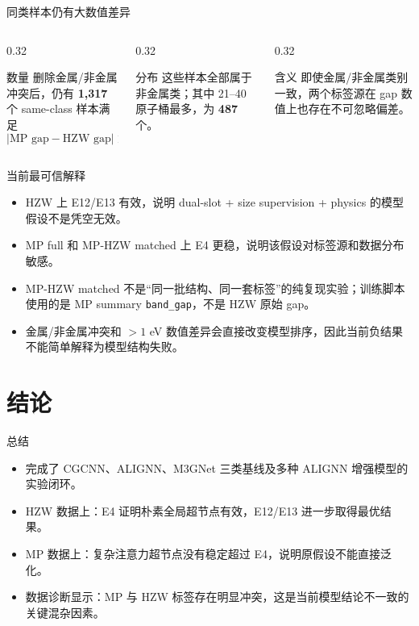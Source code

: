 \documentclass[aspectratio=169]{beamer}
\begin{document}
\begin{frame}{同类样本仍有大数值差异}
\small
\begin{columns}[T,onlytextwidth]
\begin{column}{0.32\textwidth}
\begin{block}{数量}
删除金属/非金属冲突后，仍有 \textbf{1,317} 个 same-class 样本满足
\[
|\text{MP gap} - \text{HZW gap}| > 1\ \text{eV}.
\]
\end{block}
\end{column}
\begin{column}{0.32\textwidth}
\begin{block}{分布}
这些样本全部属于非金属类；其中 21--40 原子桶最多，为 \textbf{487} 个。
\end{block}
\end{column}
\begin{column}{0.32\textwidth}
\begin{alertblock}{含义}
即使金属/非金属类别一致，两个标签源在 gap 数值上也存在不可忽略偏差。
\end{alertblock}
\end{column}
\end{columns}
\end{frame}

\begin{frame}{当前最可信解释}
\small
\begin{itemize}
  \item HZW 上 E12/E13 有效，说明 dual-slot + size supervision + physics 的模型假设不是凭空无效。
  \item MP full 和 MP-HZW matched 上 E4 更稳，说明该假设对标签源和数据分布敏感。
  \item MP-HZW matched 不是“同一批结构、同一套标签”的纯复现实验；训练脚本使用的是 MP summary \texttt{band\_gap}，不是 HZW 原始 gap。
  \item 金属/非金属冲突和 $>1$ eV 数值差异会直接改变模型排序，因此当前负结果不能简单解释为模型结构失败。
\end{itemize}
\end{frame}

\section{结论}

\begin{frame}{总结}
\small
\begin{itemize}
  \item 完成了 CGCNN、ALIGNN、M3GNet 三类基线及多种 ALIGNN 增强模型的实验闭环。
  \item HZW 数据上：E4 证明朴素全局超节点有效，E12/E13 进一步取得最优结果。
  \item MP 数据上：复杂注意力超节点没有稳定超过 E4，说明原假设不能直接泛化。
  \item 数据诊断显示：MP 与 HZW 标签存在明显冲突，这是当前模型结论不一致的关键混杂因素。
\end{itemize}
\end{frame}
\end{document}
